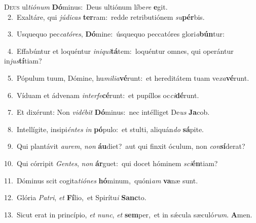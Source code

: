 \lettrine{\initial\textcolor{\initialcolor}{D}}{eus} ul\-\textit{ti}\-\textit{ó}\textit{num} \textbf{Dó}\-minus:~\star Deus ultiónum líbe\textit{re} \textbf{e}\-git.\\
{\numbfont\textcolor{\numbcolor}{~2.}}~Exaltáre, qui \textit{jú}\-\textit{di}\textit{cas} \textbf{ter}\-ram:~\star redde retributiónem \textit{su}\-\textbf{pér}bis.\par
{\numbfont\textcolor{\numbcolor}{~3.}}~Usquequo pec\-\textit{ca}\-\textit{tó}\textit{res}, \textbf{Dó}\-mine:~\star úsquequo peccatóres glori\-\textit{a}\-\textbf{bún}tur:\par
{\numbfont\textcolor{\numbcolor}{~4.}}~Effabúntur et loquéntur \textit{in}\-\textit{i}\textit{qui}\textbf{tá}tem:~\star loquéntur omnes, qui operántur in\-\textit{jus}\-\textbf{tí}tiam?\par
{\numbfont\textcolor{\numbcolor}{~5.}}~Pópulum tuum, Dómine, hu\-\textit{mi}\-\textit{li}\textit{a}\textbf{vé}runt:~\star et hereditátem tuam ve\-\textit{xa}\-\textbf{vé}runt.\par
{\numbfont\textcolor{\numbcolor}{~6.}}~Víduam et ádvenam \textit{in}\-\textit{ter}\textit{fe}\textbf{cé}runt:~\star et pupíllos oc\-\textit{ci}\-\textbf{dé}runt.\par
{\numbfont\textcolor{\numbcolor}{~7.}}~Et dixérunt: Non \textit{vi}\-\textit{dé}\textit{bit} \textbf{Dó}\-minus:~\star nec intélliget De\textit{us} \textbf{Ja}\-cob.\par
{\numbfont\textcolor{\numbcolor}{~8.}}~Intellígite, insipi\-\textit{én}\-\textit{tes} \textit{in} \textbf{pó}\-pulo:~\star et stulti, aliquán\textit{do} \textbf{sá}\-pite.\par
{\numbfont\textcolor{\numbcolor}{~9.}}~Qui plantávit \textit{au}\-\textit{rem}, \textit{non} \textbf{áu}\-diet?~\star aut qui finxit óculum, non \textit{con}\-\textbf{sí}derat?\par
{\numbfont\textcolor{\numbcolor}{10.}}~Qui córripit \textit{Gen}\-\textit{tes}, \textit{non} \textbf{ár}\-guet:~\star qui docet hóminem \textit{sci}\-\textbf{én}tiam?\par
{\numbfont\textcolor{\numbcolor}{11.}}~Dóminus scit cogita\-\textit{ti}\-\textit{ó}\textit{nes} \textbf{hó}\-minum,~\star quóni\textit{am} \textbf{va}\-næ sunt.\par
{\numbfont\textcolor{\numbcolor}{12.}}~Glória \textit{Pa}\-\textit{tri}, \textit{et} \textbf{Fí}\-lio,~\star et Spirítu\textit{i} \textbf{Sanc}\-to.\par
{\numbfont\textcolor{\numbcolor}{13.}}~Sicut erat in princípio, \textit{et} \textit{nunc}\-, \textit{et} \textbf{sem}\-per,~\star et in sǽcula sæculó\-\textit{rum}\-. \textbf{A}\-men.\par
